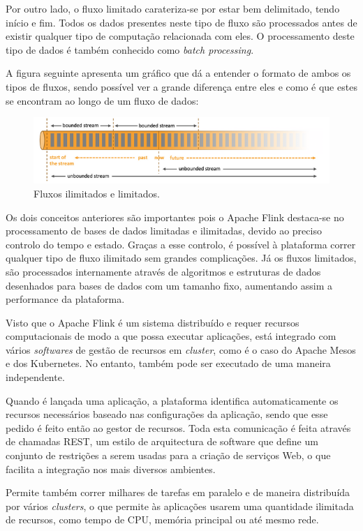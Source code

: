 \documentclass[conference]{IEEEtran}
\begin{document}
Por outro lado, o fluxo limitado carateriza-se por estar bem delimitado, tendo início e fim. Todos os dados presentes neste tipo de fluxo são processados antes de existir qualquer tipo de computação relacionada com eles. O processamento deste tipo de dados é também conhecido como \emph{batch processing}.

A figura seguinte apresenta um gráfico que dá a entender o formato de ambos os tipos de fluxos, sendo possível ver a grande diferença entre eles e como é que estes se encontram ao longo de um fluxo de dados:

\begin{figure}[!htbp]
\centering
\includegraphics[scale= 0.55]{fluxos.png}
\caption{Fluxos ilimitados e limitados.}
\label{fluxos}
\end{figure}

Os dois conceitos anteriores são importantes pois o Apache Flink destaca-se no processamento de bases de dados limitadas e ilimitadas, devido ao preciso controlo do tempo e estado. Graças a esse controlo, é possível à plataforma correr qualquer tipo de fluxo ilimitado sem grandes complicações. Já os fluxos limitados, são processados internamente através de algoritmos e estruturas de dados desenhados para bases de dados com um tamanho fixo, aumentando assim a performance da plataforma.

Visto que o Apache Flink é um sistema distribuído e requer recursos computacionais de modo a que possa executar aplicações, está integrado com vários \emph{softwares} de gestão de recursos em \emph{cluster}, como é o caso do Apache Mesos e dos Kubernetes. No entanto, também pode ser executado de uma maneira independente.

Quando é lançada uma aplicação, a plataforma identifica automaticamente os recursos necessários baseado nas configurações da aplicação, sendo que esse pedido é feito então ao gestor de recursos. Toda esta comunicação é feita através de chamadas REST, um estilo de arquitectura de software que define um conjunto de restrições a serem usadas para a criação de serviços Web, o que facilita a integração nos mais diversos ambientes.

Permite também correr milhares de tarefas em paralelo e de maneira distribuída por vários \emph{clusters}, o que permite às aplicações usarem uma quantidade ilimitada de recursos, como tempo de CPU, memória principal ou até mesmo rede.
\end{document}
